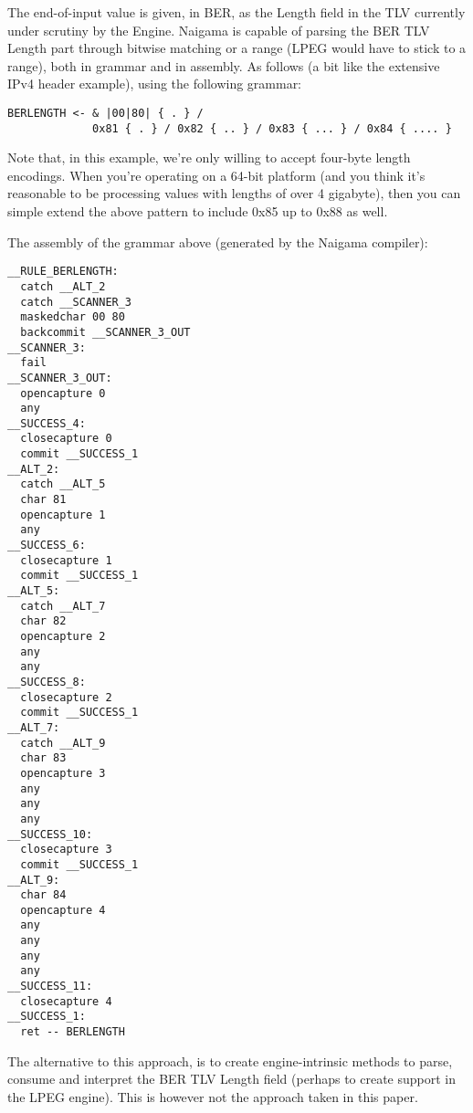 The end-of-input value is given, in BER, as the Length field in the TLV 
currently under scrutiny by the Engine. Naigama is capable of parsing the 
BER TLV Length part through bitwise matching or a range (LPEG would have
to stick to a range), both 
in grammar and in assembly. As follows (a bit like the extensive IPv4 
header example), using the following grammar:

\begin{changemargin}{-60mm}{0mm}
\begin{myquote}
\begin{verbatim}
BERLENGTH <- & |00|80| { . } /
             0x81 { . } / 0x82 { .. } / 0x83 { ... } / 0x84 { .... }
\end{verbatim}
\end{myquote}
\end{changemargin}

Note that, in this example, we’re only willing to accept four-byte 
length encodings. When you’re operating on a 64-bit platform (and you 
think it’s reasonable to be processing values with lengths of over 4 
gigabyte), then you can simple extend the above pattern to include 0x85 
up to 0x88 as well.

The assembly of the grammar above (generated by the Naigama compiler):

\begin{changemargin}{-60mm}{0mm}
\begin{myquote}
\begin{verbatim}
__RULE_BERLENGTH:
  catch __ALT_2
  catch __SCANNER_3
  maskedchar 00 80
  backcommit __SCANNER_3_OUT
__SCANNER_3:
  fail
__SCANNER_3_OUT:
  opencapture 0
  any
__SUCCESS_4:
  closecapture 0
  commit __SUCCESS_1
__ALT_2:
  catch __ALT_5
  char 81
  opencapture 1
  any
__SUCCESS_6:
  closecapture 1
  commit __SUCCESS_1
__ALT_5:
  catch __ALT_7
  char 82
  opencapture 2
  any
  any
__SUCCESS_8:
  closecapture 2
  commit __SUCCESS_1
__ALT_7:
  catch __ALT_9
  char 83
  opencapture 3
  any
  any
  any
__SUCCESS_10:
  closecapture 3
  commit __SUCCESS_1
__ALT_9:
  char 84
  opencapture 4
  any
  any
  any
  any
__SUCCESS_11:
  closecapture 4
__SUCCESS_1:
  ret -- BERLENGTH
\end{verbatim}
\end{myquote}
\end{changemargin}


The alternative to this approach, is to create engine-intrinsic methods to 
parse, consume and interpret the BER TLV Length field (perhaps to create
support in the LPEG engine).  This is however
not the approach taken in this paper.


